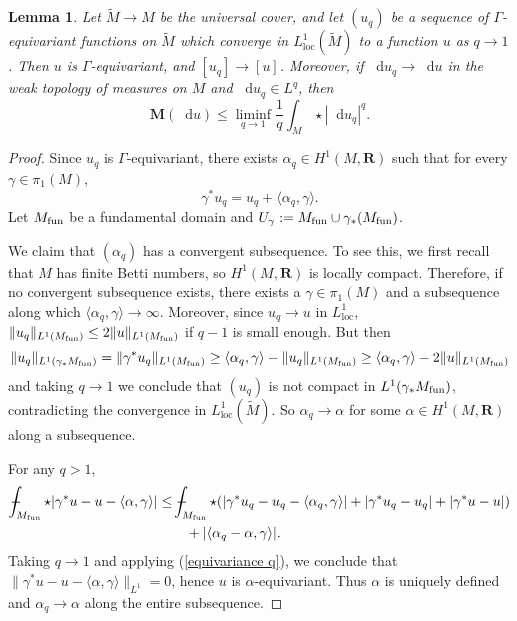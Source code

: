 \documentclass[reqno,11pt]{amsart}
\newcommand{\RR}{\mathbf{R}}
\newcommand*\dif{\mathop{}\!\mathrm{d}}
\newcommand{\Mass}{\mathbf M}
\newcommand{\loc}{\mathrm{loc}}
\newtheorem{lemma}[theorem]{Lemma}
\theoremstyle{definition}
\numberwithin{equation}{section}
\def\Xint#1{\mathchoice
{\XXint\displaystyle\textstyle{#1}}%
{\XXint\textstyle\scriptstyle{#1}}%
{\XXint\scriptstyle\scriptscriptstyle{#1}}%
{\XXint\scriptscriptstyle\scriptscriptstyle{#1}}%
\!\int}
\def\XXint#1#2#3{{\setbox0=\hbox{$#1{#2#3}{\int}$ }
\vcenter{\hbox{$#2#3$ }}\kern-.6\wd0}}
\def\dashint{\Xint-}
\begin{document}
\begin{lemma}\label{L1 convergence preserves pi1}
Let $\tilde M \to M$ be the universal cover, and let $(u_q)$ be a sequence of $\Gamma$-equivariant functions on $\tilde M$ which converge in $L^1_\loc(\tilde M)$ to a function $u$ as $q \to 1$.
Then $u$ is $\Gamma$-equivariant, and $[u_q] \to [u]$.
Moreover, if $\dif u_q \to \dif u$ in the weak topology of measures on $M$ and $\dif u_q \in L^q$, then
\begin{equation}\label{q to 1 Holder}
\Mass(\dif u) \leq \liminf_{q \to 1} \frac{1}{q} \int_M \star |\dif u_q|^q.
\end{equation}
\end{lemma}
\begin{proof}
Since $u_q$ is $\Gamma$-equivariant, there exists $\alpha_q \in H^1(M, \RR)$ such that for every $\gamma \in \pi_1(M)$,
\begin{equation}\label{equivariance q}
	\gamma^* u_q = u_q + \langle \alpha_q, \gamma\rangle.
\end{equation}
Let $M_{\rm fun}$ be a fundamental domain and $U_\gamma := M_{\rm fun} \cup \gamma_* (M_{\rm fun})$.

We claim that $(\alpha_q)$ has a convergent subsequence.
To see this, we first recall that $M$ has finite Betti numbers, so $H^1(M, \RR)$ is locally compact.
Therefore, if no convergent subsequence exists, there exists a $\gamma \in \pi_1(M)$ and a subsequence along which $\langle \alpha_q, \gamma\rangle \to \infty$.
Moreover, since $u_q \to u$ in $L^1_\loc$, $\|u_q\|_{L^1(M_{\rm fun})} \leq 2\|u\|_{L^1(M_{\rm fun})}$ if $q - 1$ is small enough.
But then 
$$\|u_q\|_{L^1(\gamma_* M_{\rm fun})} = \|\gamma^* u_q\|_{L^1(M_{\rm fun})} \geq \langle \alpha_q, \gamma\rangle - \|u_q\|_{L^1(M_{\rm fun})} \geq \langle \alpha_q, \gamma\rangle - 2\|u\|_{L^1(M_{\rm fun})}$$
and taking $q \to 1$ we conclude that $(u_q)$ is not compact in $L^1(\gamma_* M_{\rm fun})$, contradicting the convergence in $L^1_\loc(\tilde M)$.
So $\alpha_q \to \alpha$ for some $\alpha \in H^1(M, \RR)$ along a subsequence.

For any $q > 1$,
\begin{align*}
\dashint_{M_{\rm fun}} \star |\gamma^* u - u - \langle \alpha, \gamma\rangle| 
&\leq \dashint_{M_{\rm fun}} \star (|\gamma^* u_q - u_q - \langle \alpha_q, \gamma\rangle| + |\gamma^* u_q - u_q| + |\gamma^* u - u|) \\
&\qquad + |\langle \alpha_q - \alpha, \gamma\rangle|.
\end{align*}
Taking $q \to 1$ and applying (\ref{equivariance q}), we conclude that $\|\gamma^* u - u - \langle \alpha, \gamma\rangle\|_{L^1} = 0$, hence $u$ is $\alpha$-equivariant.
Thus $\alpha$ is uniquely defined and $\alpha_q \to \alpha$ along the entire subsequence.


\end{proof}
\end{document}
